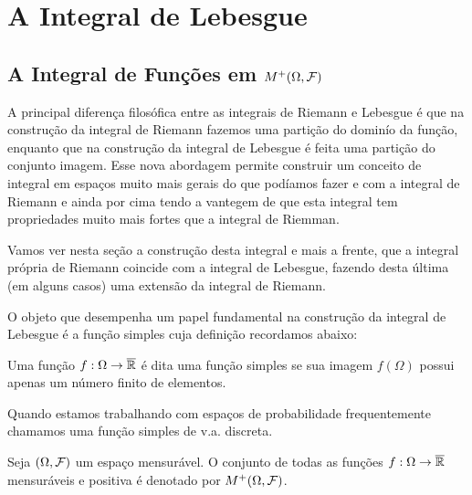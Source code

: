 \chapter[Aula 9]{A Integral de Lebesgue}
\chaptermark{}

\section{A Integral de Funções em $M^{+}(\Omega,\mathcal{F})$}

A principal diferença filosófica entre as integrais de Riemann e 
Lebesgue é que na construção da integral de Riemann 
fazemos uma partição do dominío da função, enquanto que na construção da
integral de Lebesgue é feita uma partição do conjunto imagem.
Esse nova abordagem permite construir um conceito de integral em espaços
muito mais gerais do que podíamos fazer e com 
a integral de Riemann e ainda por cima tendo a vantegem 
de que esta integral tem propriedades muito mais fortes 
que a integral de Riemman. 

Vamos ver nesta seção a construção desta integral 
e mais a frente, que a integral própria 
de Riemann coincide com a integral de Lebesgue, fazendo
desta última (em alguns casos) uma extensão da integral 
de Riemann.

O objeto que desempenha um papel fundamental na 
construção da integral de Lebesgue é a função simples
cuja definição recordamos abaixo:
%
%
\begin{definicao}\label{def-funcao-simples}
Uma função $f:\Omega\to\overline{\mathbb{R}}$ é dita uma função simples
se sua imagem $f(\Omega)$ possui apenas um número
finito de elementos.
\end{definicao}
%
%
%
%
\begin{observacao}
Quando estamos trabalhando com 
espaços de probabilidade frequentemente chamamos uma
função simples de v.a. discreta.
\end{observacao}


\begin{definicao}
Seja $(\Omega,\mathcal{F})$ um espaço mensurável. 
O conjunto de todas as funções $f:\Omega\to\overline{\mathbb{R}}$ 
mensuráveis e positiva é denotado por $M^{+}(\Omega,\mathcal{F})$.
\end{definicao}


